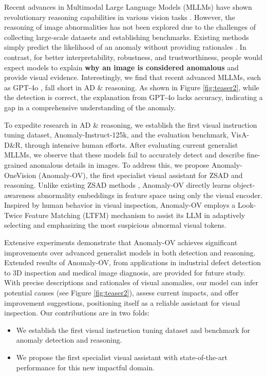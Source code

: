 Recent advances in Multimodal Large Language Models (MLLMs) \cite{blip, zhu2024minigpt, instructblip, chen2024spatialvlm, llava, llava15, llava_interleave, llavaonevision, llavamed} have shown revolutionary reasoning capabilities in various vision tasks \cite{lv2024video, yang2024follow, cheng2024emotion, guo2024stimuvar, zhou2024vicor, sermanet2024robovqa, xie2025funqa, zhou2024navgpt, nie2025reason2drive}. However, the reasoning of image abnormalities has not been explored due to the challenges of collecting large-scale datasets and establishing benchmarks. Existing methods simply predict the likelihood of an anomaly without providing rationales \cite{jeong2023winclip, zhou2024anomalyclip, cao2025adaclip, deng2023anovl, april-gan}. In contrast, for better interpretability, robustness, and trustworthiness, people would expect models to explain \textbf{why an image is considered anomalous} and provide visual evidence. Interestingly, we find that recent advanced MLLMs, such as GPT-4o \cite{gpt-api-4o}, fall short in AD \& reasoning. As shown in Figure \ref{fig:teaser2}, while the detection is correct, the explanation from GPT-4o lacks accuracy, indicating a gap in a comprehensive understanding of the anomaly.

To expedite research in AD \& reasoning, we establish the first visual instruction tuning dataset, Anomaly-Instruct-125k, and the evaluation benchmark, VisA-D\&R, through intensive human efforts. After evaluating current generalist MLLMs, we observe that these models fail to accurately detect and describe fine-grained anomalous details in images. To address this, we propose Anomaly-OneVision (Anomaly-OV), the first specialist visual assistant for ZSAD and reasoning. Unlike existing ZSAD methods \cite{jeong2023winclip, zhou2024anomalyclip, cao2025adaclip, deng2023anovl, april-gan}, Anomaly-OV directly learns object-awareness abnormality embeddings in feature space using only the visual encoder. Inspired by human behavior in visual inspection, Anomaly-OV employs a Look-Twice Feature Matching (LTFM) mechanism to assist its LLM in adaptively selecting and emphasizing the most suspicious abnormal visual tokens.

Extensive experiments demonstrate that Anomaly-OV achieves significant improvements over advanced generalist models in both detection and reasoning. Extended results of Anomaly-OV, from applications in industrial defect detection to 3D inspection and medical image diagnosis, are provided for future study. With precise descriptions and rationales of visual anomalies, our model can infer potential causes (see Figure \ref{fig:teaser2}), assess current impacts, and offer improvement suggestions, positioning itself as a reliable assistant for visual inspection. Our contributions are in two folds:
\begin{itemize}
	\item We establish the first visual instruction tuning dataset and benchmark for anomaly detection and reasoning.
	\item We propose the first specialist visual assistant with state-of-the-art performance for this new impactful domain.
\end{itemize}


